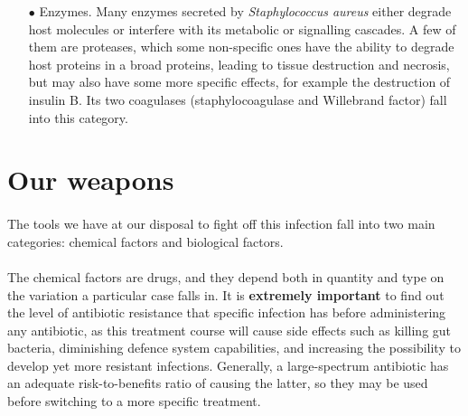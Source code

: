 \begin{itemize}
\item[$\bullet$] Enzymes. Many enzymes secreted by \emph{Staphylococcus aureus} either degrade host molecules or interfere with its metabolic or signalling cascades. A few of them are proteases, which some non-specific ones have the ability to degrade host proteins in a broad proteins, leading to tissue destruction and necrosis, but may also have some more specific effects, for example the destruction of insulin B. Its two coagulases (staphylocoagulase and Willebrand factor) fall into this category.
\end{itemize}
\section{Our weapons}
\paragraph{} The tools we have at our disposal to fight off this infection fall into two main categories: chemical factors and biological factors.
\paragraph{} The chemical factors are drugs, and they depend both in quantity and type on the variation a particular case falls in. It is \textbf{extremely important} to find out the level of antibiotic resistance that specific infection has before administering any antibiotic, as this treatment course will cause side effects such as killing gut bacteria, diminishing defence system capabilities, and increasing the possibility to develop yet more resistant infections. Generally, a large-spectrum antibiotic has an adequate risk-to-benefits ratio of causing the latter, so they may be used before switching to a more specific treatment.

